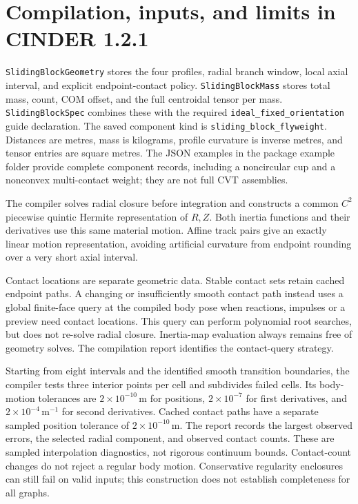 \documentclass[11pt,letterpaper]{article}
\numberwithin{equation}{section}
\begin{document}
\section{Compilation, inputs, and limits in CINDER 1.2.1}

\texttt{SlidingBlockGeometry} stores the four profiles, radial branch window,
local axial interval, and explicit endpoint-contact policy.
\texttt{SlidingBlockMass} stores total mass, count, COM offset, and the full
centroidal tensor per mass. \texttt{SlidingBlockSpec} combines these with the
required \texttt{ideal\_fixed\_orientation} guide declaration.
The saved component kind is \texttt{sliding\_block\_flyweight}. Distances are
metres, mass is kilograms, profile curvature is inverse metres, and tensor
entries are square metres. The JSON examples in the package example folder provide complete component
records, including a noncircular cup and a nonconvex multi-contact weight;
they are not full CVT assemblies.

The compiler solves radial closure before integration and constructs a
common $C^2$ piecewise quintic Hermite representation of $R,Z$. Both inertia
functions and their derivatives use this same material motion. Affine track
pairs give an exactly linear motion representation, avoiding artificial
curvature from endpoint rounding over a very short axial interval.

Contact locations are separate geometric data. Stable contact sets retain
cached endpoint paths. A changing or insufficiently smooth contact path
instead uses a global finite-face query at the compiled body pose when
reactions, impulses or a preview need contact locations. This query can
perform polynomial root searches, but does not re-solve radial closure.
Inertia-map evaluation always remains free of geometry solves. The
compilation report identifies the contact-query strategy.

Starting from eight intervals and the identified smooth transition boundaries,
the compiler tests three interior points per cell and subdivides failed cells.
Its body-motion tolerances are $2\times10^{-10}\,\mathrm m$ for positions,
$2\times10^{-7}$ for first derivatives, and
$2\times10^{-4}\,\mathrm{m^{-1}}$ for second derivatives. Cached contact paths
have a separate sampled position tolerance of $2\times10^{-10}\,\mathrm m$.
The report records the largest observed errors, the selected radial component,
and observed contact counts. These are sampled interpolation diagnostics,
not rigorous continuum bounds. Contact-count changes do not reject a regular
body motion. Conservative regularity enclosures can still fail on valid
inputs; this construction does not establish completeness for all graphs.
\end{document}
